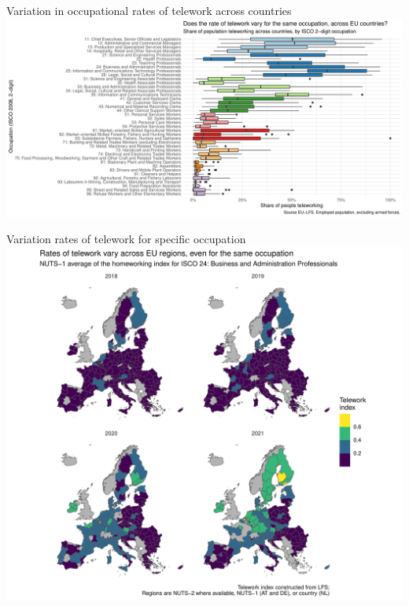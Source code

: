 \documentclass[10pt]{beamer}
\begin{document}
\begin{frame}{Variation in occupational rates of telework across countries}
\pause
\centering
\includegraphics[width=\textwidth,height=0.9\textheight,keepaspectratio]{Variation_telework_occupation_boxplot.pdf}
\end{frame}

\begin{frame}{Variation rates of telework for specific occupation}
\pause
\centering
\includegraphics[width=\textwidth,height=0.9\textheight,keepaspectratio]{telework_isco24_countries.pdf}
\end{frame}
\end{document}
